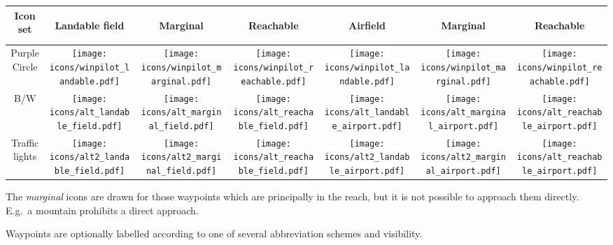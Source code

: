\begin{tabular}{c|ccc|ccc|}
Icon set 
&\begin{sideways}Landable field\end{sideways}
&\begin{sideways}Marginal\end{sideways}
&\begin{sideways}Reachable\end{sideways}
&\begin{sideways}Airfield\end{sideways}
&\begin{sideways}Marginal\end{sideways}
&\begin{sideways}Reachable\end{sideways}\\
\hline
Purple Circle &
\texttt{[image: icons/winpilot\_landable.pdf]} &
\texttt{[image: icons/winpilot\_marginal.pdf]} &
\texttt{[image: icons/winpilot\_reachable.pdf]} &
\colorbox{white}{\texttt{[image: icons/winpilot\_landable.pdf]}} &
\texttt{[image: icons/winpilot\_marginal.pdf]} &
\texttt{[image: icons/winpilot\_reachable.pdf]} \\
\hline
B/W & 
\texttt{[image: icons/alt\_landable\_field.pdf]} &
\texttt{[image: icons/alt\_marginal\_field.pdf]} &
\texttt{[image: icons/alt\_reachable\_field.pdf]} &
\colorbox[rgb]{0.94,0.94,0.94}{\texttt{[image: icons/alt\_landable\_airport.pdf]}} &
\texttt{[image: icons/alt\_marginal\_airport.pdf]} &
\texttt{[image: icons/alt\_reachable\_airport.pdf]} \\
\hline
Traffic lights & 
\texttt{[image: icons/alt2\_landable\_field.pdf]} &
\texttt{[image: icons/alt2\_marginal\_field.pdf]} &
\texttt{[image: icons/alt\_reachable\_field.pdf]} &
\colorbox{white}{\texttt{[image: icons/alt2\_landable\_airport.pdf]}} &
\texttt{[image: icons/alt2\_marginal\_airport.pdf]} &
\texttt{[image: icons/alt\_reachable\_airport.pdf]} \\
\hline
\end{tabular}

The \emph{marginal} icons are drawn for those waypoints which are principally in the 
reach, but it is not possible to approach them directly. E.g.\ a mountain prohibits a direct approach.
  
Waypoints are optionally labelled according to one of several
abbreviation schemes  and visibility.

